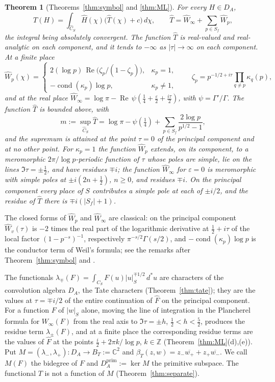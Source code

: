 \documentclass[11pt]{amsart}
\newtheorem{theorem}{Theorem}[section]
\theoremstyle{definition}
\theoremstyle{remark}
\newcommand{\C}{\mathbb C}
\newcommand{\Z}{\mathbb Z}
\newcommand{\dstar}{\,d^{*}}
\newcommand{\Rel}{\operatorname{Re}}
\newcommand{\cond}{\operatorname{cond}}
\begin{document}
\begin{theorem}[Theorems~\ref{thm:symbol} and \ref{thm:ML}]\label{thm:introB}
For every $H\in D_A$,
\[
T(H)=\int_{\widehat C_S}\widehat H(\chi)\bigl(\widehat T(\chi)+c\bigr)\,d\chi,
\qquad
\widehat T=\widehat W_{\infty}+\sum_{p\in S_f}\widehat W_p ,
\]
the integral being absolutely convergent.  The function $\widehat T$ is
real-valued and real-analytic on each component, and it tends to $-\infty$ as
$|\tau|\to\infty$ on each component.  At a finite place
\[
\widehat W_p(\chi)=
\begin{cases}
2(\log p)\,\Rel\bigl(\zeta_p/(1-\zeta_p)\bigr), & \kappa_p=1,\\[2pt]
-\cond(\kappa_p)\log p, & \kappa_p\neq1,
\end{cases}
\qquad \zeta_p=p^{-1/2+i\tau}\prod_{q\ne p}\kappa_q(p),
\]
and at the real place
$\widehat W_{\infty}=\log\pi-\Rel\,\psi(\tfrac14+\tfrac{\varepsilon}{2}
+\tfrac{i\tau}2)$, with $\psi=\Gamma'/\Gamma$.  The function $\widehat T$ is
bounded above, with
\[
m:=\sup_{\widehat C_S}\widehat T
=\log\pi-\psi(\tfrac14)+\sum_{p\in S_f}\frac{2\log p}{p^{1/2}-1},
\]
and the supremum is attained at the point $\tau=0$ of the principal component
and at no other point.  For $\kappa_p=1$ the function $\widehat W_p$ extends,
on its component, to a meromorphic $2\pi/\log p$-periodic function of $\tau$
whose poles are simple, lie on the lines $\Im\tau=\pm\tfrac12$, and have
residues $\mp i$; the function $\widehat W_{\infty}$ for $\varepsilon=0$ is
meromorphic with simple poles at $\pm i(2n+\tfrac12)$, $n\ge0$, and residues
$\mp i$.  On the principal component every place of $S$ contributes a simple
pole at each of $\pm i/2$, and the residue of $\widehat T$ there is
$\mp i(|S_f|+1)$.
\end{theorem}

The closed forms of $\widehat W_p$ and $\widehat W_{\infty}$ are classical: on
the principal component $\widehat W_v(\tau)$ is $-2$ times the real part of
the logarithmic derivative at $\tfrac12+i\tau$ of the local factor
$(1-p^{-s})^{-1}$, respectively $\pi^{-s/2}\Gamma(s/2)$, and
$-\cond(\kappa_p)\log p$ is the conductor term of Weil's formula; see the
remarks after Theorem~\ref{thm:symbol} and \cite{BurnolConductor,BurnolCR}.

The functionals
$\lambda_{\mp}(F)=\int_{C_S}F(u)|u|_S^{\mp1/2}\dstar u$ are characters of the
convolution algebra $D_A$, the Tate characters (Theorem~\ref{thm:tate}); they
are the values at $\tau=\mp i/2$ of the entire continuation of $\widehat F$
on the principal component.  For a function $F$ of $|w|_S$ alone, moving the
line of integration in the Plancherel formula for $W_{\infty}(F)$ from the
real axis to $\Im\tau=\pm h$, $\tfrac12<h<\tfrac52$, produces the residue
term $\lambda_{\pm}(F)$, and at a finite place the corresponding residue
terms are the values of $\widehat F$ at the points
$\tfrac i2+2\pi k/\log p$, $k\in\Z$ (Theorem~\ref{thm:ML}(d),(e)).  Put
$M=(\lambda_-,\lambda_+):D_A\to B_T:=\C^{2}$ and
$\beta_T(z,w)=z_-\overline{w_+}+z_+\overline{w_-}$.  We call $M(F)$ the
bidegree of $F$ and $D_A^{\mathrm{prim}}:=\ker M$ the primitive subspace.  The
functional $T$ is not a function of $M$ (Theorem~\ref{thm:separate}).
\end{document}
